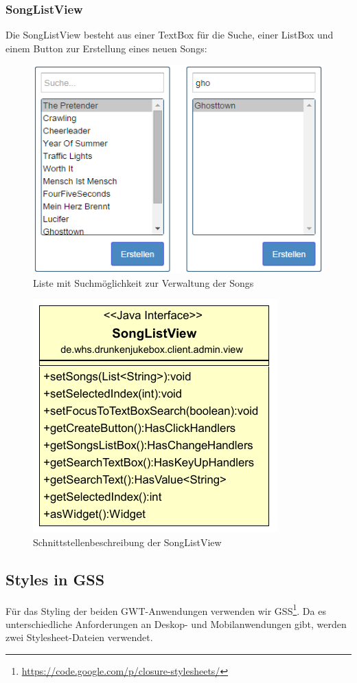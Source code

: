 \subsubsection{SongListView}
Die SongListView besteht aus einer TextBox für die Suche, einer ListBox und einem Button zur Erstellung eines neuen Songs:

\begin{figure}[H]
\centering
\includegraphics[width=0.7\linewidth]{Bilder/SongListView}
\caption{Liste mit Suchmöglichkeit zur Verwaltung der Songs}
\label{fig:SongListView}
\end{figure}



\begin{figure}[H]
\centering
\includegraphics[width=0.4\linewidth]{Bilder/SongListViewClass}
\caption{Schnittstellenbeschreibung der SongListView}
\label{fig:SongListViewClass}
\end{figure}


\subsection{Styles in GSS}
Für das Styling der beiden GWT-Anwendungen verwenden wir GSS\footnote{\url{https://code.google.com/p/closure-stylesheets/}}. Da es unterschiedliche Anforderungen
an Deskop- und Mobilanwendungen gibt, werden zwei Stylesheet-Dateien verwendet.

